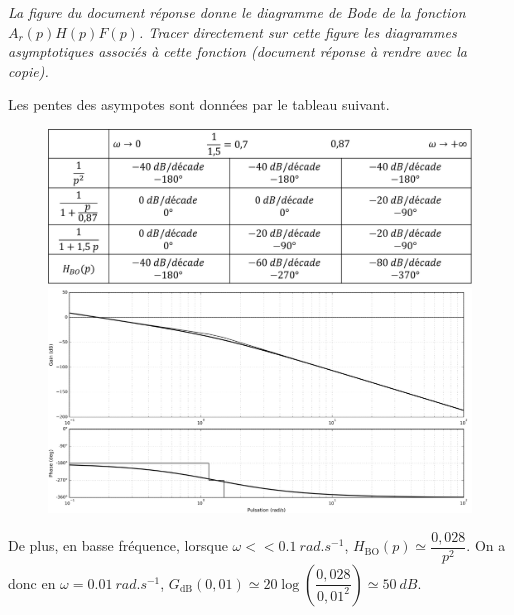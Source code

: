 \question{\label{q_15}}\textit{La figure du document réponse donne le diagramme de Bode de la fonction $A_r(p)H(p)F(p)$. Tracer
directement sur cette figure les diagrammes asymptotiques associés à cette fonction (document réponse à rendre
avec la copie).}
\ifprof
\begin{corrige}
Les pentes des asympotes sont données par le tableau suivant. 
\begin{figure}[H]
\centering
\includegraphics[width=.8\linewidth]{images/cor_q15}

\includegraphics[width=.8\linewidth]{images/cor_q15_bode}
\end{figure}

De plus, en basse fréquence, lorsque 
$\omega << \SI{0,1}{rad.s^{-1}}$, 
$H_{\text{BO}}(p)\simeq \dfrac{0,028}{p^2}$. 
On a donc  en $\omega = \SI{0,01}{rad.s^{-1}}$, $G_{\text{dB}}(0,01)\simeq 20\log \left(\dfrac{0,028}{0,01^2}\right)\simeq \SI{50}{dB}$.


\end{corrige}
\else
\fi

